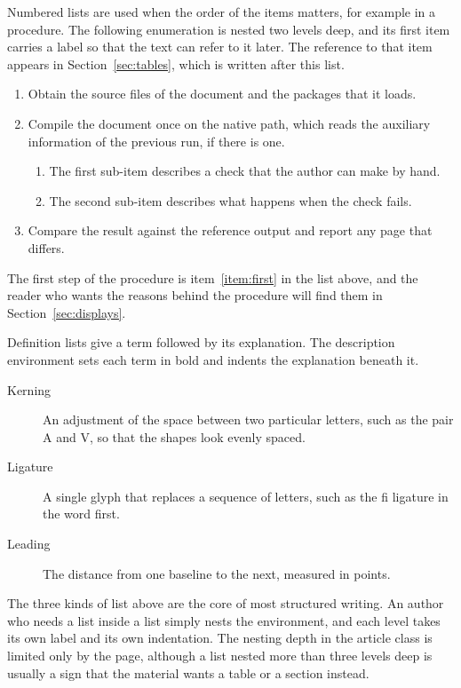 \documentclass{article}
\begin{document}
Numbered lists are used when the order of the items matters, for example in a
procedure. The following enumeration is nested two levels deep, and its first item
carries a label so that the text can refer to it later. The reference to that item
appears in Section~\ref{sec:tables}, which is written after this list.

\begin{enumerate}
  \item\label{item:first} Obtain the source files of the document and the packages that
        it loads.
  \item Compile the document once on the native path, which reads the auxiliary
        information of the previous run, if there is one.
        \begin{enumerate}
          \item The first sub-item describes a check that the author can make by hand.
          \item The second sub-item describes what happens when the check fails.
        \end{enumerate}
  \item Compare the result against the reference output and report any page that
        differs.
\end{enumerate}

The first step of the procedure is item~\ref{item:first} in the list above, and the
reader who wants the reasons behind the procedure will find them in
Section~\ref{sec:displays}.

Definition lists give a term followed by its explanation. The description environment
sets each term in bold and indents the explanation beneath it.

\begin{description}
  \item[Kerning] An adjustment of the space between two particular letters, such as
        the pair A and V, so that the shapes look evenly spaced.
  \item[Ligature] A single glyph that replaces a sequence of letters, such as the
        fi ligature in the word first.
  \item[Leading] The distance from one baseline to the next, measured in points.
\end{description}

The three kinds of list above are the core of most structured writing. An author who
needs a list inside a list simply nests the environment, and each level takes its own
label and its own indentation. The nesting depth in the article class is limited only
by the page, although a list nested more than three levels deep is usually a sign that
the material wants a table or a section instead.
\end{document}
